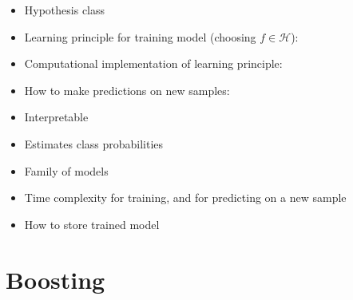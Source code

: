 \documentclass[11pt]{article}
\newcommand{\Hc}{\mathcal{H}}
\begin{document}
\begin{itemize}
  \item Hypothesis class 
       \item Learning principle for training model (choosing $f\in\Hc$):
	     \item Computational implementation of learning principle:
  \item How to make predictions on new samples:  
  \item Interpretable
    \item Estimates class probabilities 
    \item Family of models
       \item Time complexity for training, and for predicting on a new sample
  \item How to store trained model
\end{itemize}

\section{Boosting}
\end{document}
